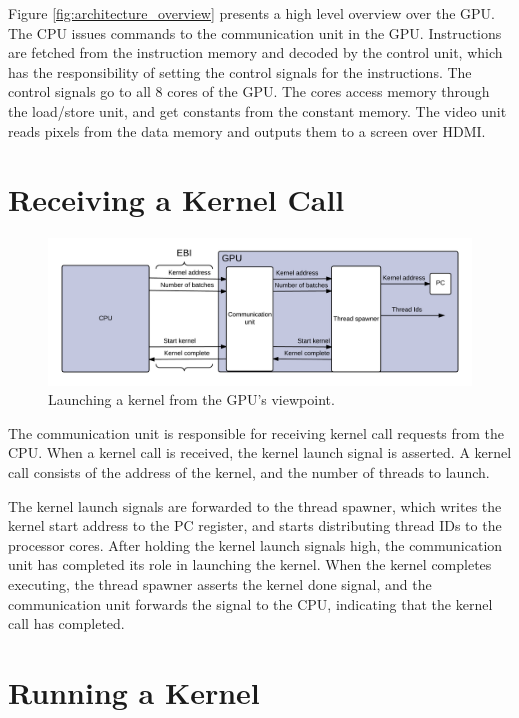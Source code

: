 \documentclass[../main/report.tex]{subfiles}
\begin{document}
Figure \ref{fig:architecture_overview} presents a high level overview over the GPU.
The CPU issues commands to the communication unit in the GPU.
Instructions are fetched from the instruction memory and decoded by the control unit,
which has the responsibility of setting the control signals for the instructions.
The control signals go to all 8 cores of the GPU.
The cores access memory through the load/store unit, and get constants from the constant memory.
The video unit reads pixels from the data memory and outputs them to a screen over HDMI.

\section{Receiving a Kernel Call}
\begin{figure}[H]
\centering
\includegraphics[width=\textwidth]{../gpu/diagrams/receiving_a_kernel_call.png}
\caption{Launching a kernel from the GPU's viewpoint.}
\label{fig:kernel_call}
\end{figure}

The communication unit is responsible for receiving kernel call requests from the CPU.
When a kernel call is received, the kernel launch signal is asserted.
A kernel call consists of the address of the kernel, and the number of threads to launch.

The kernel launch signals are forwarded to the thread spawner, which writes the kernel start address to the PC register, and starts distributing thread IDs to the processor cores. 
After holding the kernel launch signals high, the communication unit has completed its role in launching the kernel.
When the kernel completes executing, the thread spawner asserts the kernel done signal, and the communication unit forwards the signal to the CPU, indicating that the kernel call has completed.

\section{Running a Kernel}
\end{document}
